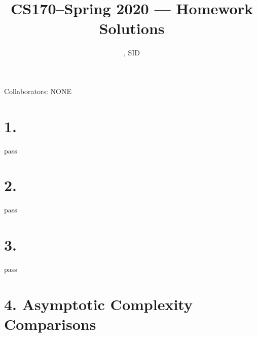 \documentclass[11pt]{article}
\title{CS170--Spring 2020 --- Homework \Homework Solutions}
\author{\Name, SID \SID}
\date{}
\begin{document}
\maketitle

Collaborators: NONE

\section*{1.}
pass
\section*{2.}
pass
\section*{3.}
pass
\section*{4. Asymptotic Complexity Comparisons}
\end{document}
